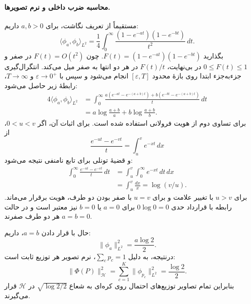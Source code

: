 \paragraph{محاسبه ضرب داخلی و نرم تصویرها.}
مستقیماً از تعریف نگاشت، برای $a,b>0$ داریم:
\[
\langle\phi_a,\phi_b\rangle_{L^2}
=\frac14\int_0^\infty
\frac{(1-e^{-at})(1-e^{-bt})}{t^2}\,dt.
\]
بگذارید $F(t)=(1-e^{-at})(1-e^{-bt})$. چون $F(t)=O(t^2)$ در صفر و $0\le F(t)\le1$ در بی‌نهایت، $F(t)/t$ در هر دو انتها به صفر میل می‌کند. انتگرال‌گیری جزءبه‌جزء ابتدا روی بازهٔ محدود $[\varepsilon,T]$ انجام می‌شود و سپس با $\varepsilon\to0^+$ و $T\to\infty$، رابطهٔ زیر حاصل می‌شود:
\begin{equation}\label{eq:app-ch3-js-integral-representation}
\begin{aligned}
4\langle\phi_a,\phi_b\rangle_{L^2}
&=\int_0^\infty\frac{
a(e^{-at}-e^{-(a+b)t})
+b(e^{-bt}-e^{-(a+b)t})}{t}\,dt\\
&=a\log\frac{a+b}{a}
+b\log\frac{a+b}{b}.
\end{aligned}
\end{equation}
برای تساوی دوم از هویت فرولانی استفاده شده است. برای اثبات آن، اگر $0<u<v$، از
\[
\frac{e^{-ut}-e^{-vt}}{t}=\int_u^v e^{-xt}\,dx
\]
و قضیهٔ تونلی برای تابع نامنفی نتیجه می‌شود:
\[
\begin{aligned}
\int_0^\infty\frac{e^{-ut}-e^{-vt}}{t}\,dt
&=\int_u^v\int_0^\infty e^{-xt}\,dt\,dx\\
&=\int_u^v\frac{dx}{x}=\log(v/u).
\end{aligned}
\]
برای $u>v$ با تغییر علامت و برای $u=v$ با صفر بودن دو طرف، هویت برقرار می‌ماند. رابطه با قرارداد حدی $0\log0=0$ برای $a=0$ یا $b=0$ نیز معتبر است و در حالت $a=b=0$ هر دو طرف صفرند.

حال با قرار دادن $a=b$، داریم:
\[
\|\phi_a\|_{L^2}^2=\frac{a\log2}{2}.
\]
درنتیجه، به دلیل $\sum_cp_c=1$، نرم تصویر هر توزیع ثابت است:
\begin{equation}\label{eq:app-ch3-js-sphere}
\boxed{
\|\Phi(P)\|_{\mathcal H}^2
=\sum_{c=1}^{K}\|\phi_{p_c}\|_{L^2}^2
=\frac{\log2}{2}.
}
\end{equation}
بنابراین تمام تصاویر توزیع‌های احتمال روی کره‌ای به شعاع
$\sqrt{\log2/2}$ در $\mathcal H$ قرار می‌گیرند.

